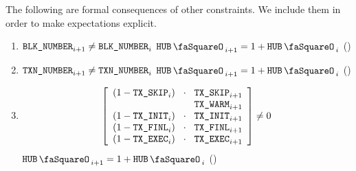 The following are formal consequences of other constraints.
We include them in order to make expectations explicit.
\begin{enumerate}
	\item \If $\texttt{BLK\_NUMBER}       _{i + 1} \neq \texttt{BLK\_NUMBER}       _{i}$ \Then $\hubStamp _{i + 1} = 1 + \hubStamp _{i}$ (\sanityCheck)
	\item \If $\texttt{TXN\_NUMBER} _{i + 1} \neq \texttt{TXN\_NUMBER} _{i}$ \Then $\hubStamp _{i + 1} = 1 + \hubStamp _{i}$ (\sanityCheck)
        \item \If
		\[
			\left[ \begin{array}{lcl}
				(1 - \txSkip _{i}) & \!\!\!\cdot\!\!\! & \txSkip _{i + 1} \\
				                   &                   & \txWarm _{i + 1} \\
				(1 - \txInit _{i}) & \!\!\!\cdot\!\!\! & \txInit _{i + 1} \\
				(1 - \txFinl _{i}) & \!\!\!\cdot\!\!\! & \txFinl _{i + 1} \\
				(1 - \txExec _{i}) & \!\!\!\cdot\!\!\! & \txExec _{i + 1} \\
			\end{array} \right]
			\neq 0
		\]
		\Then $\hubStamp _{i + 1} = 1 + \hubStamp _{i}$ (\sanityCheck)
\end{enumerate}
